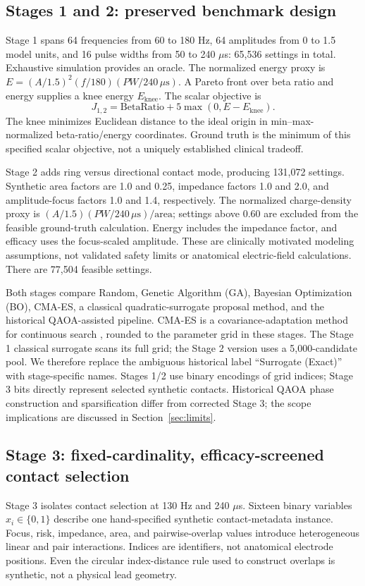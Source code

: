 \documentclass[11pt,letterpaper]{article}
\newcommand{\br}{\mathrm{BetaRatio}}
\begin{document}
\subsection{Stages 1 and 2: preserved benchmark design}
Stage 1 spans 64 frequencies from 60 to 180 Hz, 64 amplitudes from 0 to 1.5 model units, and 16 pulse widths from 50 to 240 $\mu$s: 65,536 settings in total. Exhaustive simulation provides an oracle. The normalized energy proxy is $E=(A/1.5)^2(f/180)(PW/240\,\mu\mathrm{s})$. A Pareto front over beta ratio and energy supplies a knee energy $E_{\mathrm{knee}}$. The scalar objective is
\begin{equation}
J_{1,2}=\br+5\max(0,E-E_{\mathrm{knee}}).
\end{equation}
The knee minimizes Euclidean distance to the ideal origin in min--max-normalized beta-ratio/energy coordinates. Ground truth is the minimum of this specified scalar objective, not a uniquely established clinical tradeoff.

Stage 2 adds ring versus directional contact mode, producing 131,072 settings. Synthetic area factors are 1.0 and 0.25, impedance factors 1.0 and 2.0, and amplitude-focus factors 1.0 and 1.4, respectively. The normalized charge-density proxy is $(A/1.5)(PW/240\,\mu\mathrm{s})/\mathrm{area}$; settings above 0.60 are excluded from the feasible ground-truth calculation. Energy includes the impedance factor, and efficacy uses the focus-scaled amplitude. These are clinically motivated modeling assumptions, not validated safety limits or anatomical electric-field calculations. There are 77,504 feasible settings.

Both stages compare Random, Genetic Algorithm (GA), Bayesian Optimization (BO), CMA-ES, a classical quadratic-surrogate proposal method, and the historical QAOA-assisted pipeline. CMA-ES is a covariance-adaptation method for continuous search \cite{hansen}, rounded to the parameter grid in these stages. The Stage 1 classical surrogate scans its full grid; the Stage 2 version uses a 5,000-candidate pool. We therefore replace the ambiguous historical label ``Surrogate (Exact)'' with stage-specific names. Stages 1/2 use binary encodings of grid indices; Stage 3 bits directly represent selected synthetic contacts. Historical QAOA phase construction and sparsification differ from corrected Stage 3; the scope implications are discussed in Section~\ref{sec:limits}.

\subsection{Stage 3: fixed-cardinality, efficacy-screened contact selection}
Stage 3 isolates contact selection at 130 Hz and 240 $\mu$s. Sixteen binary variables $x_i\in\{0,1\}$ describe one hand-specified synthetic contact-metadata instance. Focus, risk, impedance, area, and pairwise-overlap values introduce heterogeneous linear and pair interactions. Indices are identifiers, not anatomical electrode positions. Even the circular index-distance rule used to construct overlaps is synthetic, not a physical lead geometry.
\end{document}
